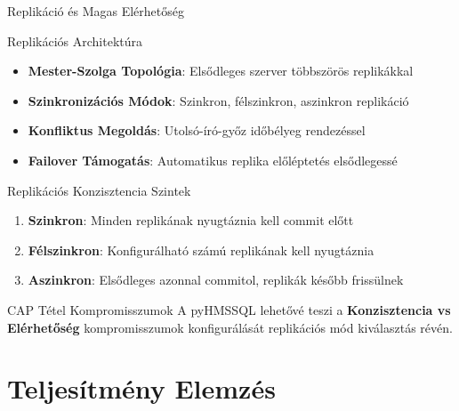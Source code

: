 \documentclass[aspectratio=169]{beamer}
\begin{document}
\begin{frame}{Replikáció és Magas Elérhetőség}
\begin{block}{Replikációs Architektúra}
\begin{itemize}
    \item \textbf{Mester-Szolga Topológia}: Elsődleges szerver többszörös replikákkal
    \item \textbf{Szinkronizációs Módok}: Szinkron, félszinkron, aszinkron replikáció
    \item \textbf{Konfliktus Megoldás}: Utolsó-író-győz időbélyeg rendezéssel
    \item \textbf{Failover Támogatás}: Automatikus replika előléptetés elsődlegessé
\end{itemize}
\end{block}

\begin{block}{Replikációs Konzisztencia Szintek}
\begin{enumerate}
    \item \textbf{Szinkron}: Minden replikának nyugtáznia kell commit előtt
    \item \textbf{Félszinkron}: Konfigurálható számú replikának kell nyugtáznia
    \item \textbf{Aszinkron}: Elsődleges azonnal commitol, replikák később frissülnek
\end{enumerate}
\end{block}

\begin{block}{CAP Tétel Kompromisszumok}
A pyHMSSQL lehetővé teszi a \textbf{Konzisztencia vs Elérhetőség} kompromisszumok konfigurálását replikációs mód kiválasztás révén.
\end{block}
\end{frame}

\section{Teljesítmény Elemzés}
\end{document}
